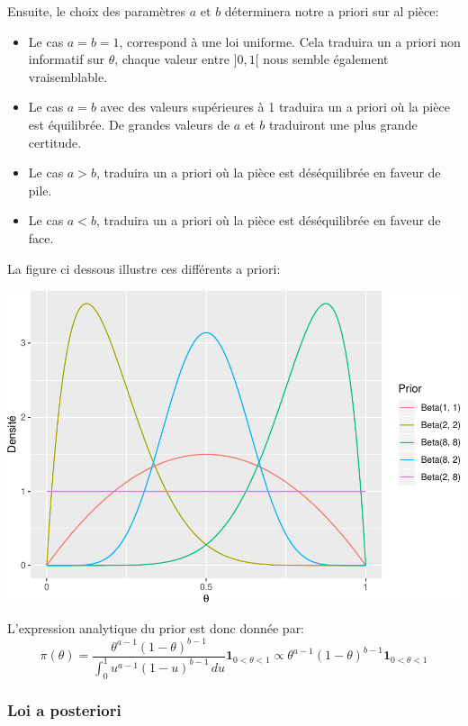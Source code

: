 \documentclass[]{article}
\providecommand{\tightlist}{%
  \setlength{\itemsep}{0pt}\setlength{\parskip}{0pt}}
\begin{document}
Ensuite, le choix des paramètres \(a\) et \(b\) déterminera notre a
priori sur al pièce:

\begin{itemize}
\tightlist
\item
  Le cas \(a = b = 1\), correspond à une loi uniforme. Cela traduira un
  a priori non informatif sur \(\theta\), chaque valeur entre \(]0,1[\)
  nous semble également vraisemblable.
\item
  Le cas \(a = b\) avec des valeurs supérieures à 1 traduira un a priori
  où la pièce est équilibrée. De grandes valeurs de \(a\) et \(b\)
  traduiront une plus grande certitude.
\item
  Le cas \(a > b\), traduira un a priori où la pièce est déséquilibrée
  en faveur de pile.
\item
  Le cas \(a < b\), traduira un a priori où la pièce est déséquilibrée
  en faveur de face.
\end{itemize}

La figure ci dessous illustre ces différents a priori:

\includegraphics{poly_cours_files/figure-latex/df_prior-1.pdf}

L'expression analytique du prior est donc donnée par:
\[\pi(\theta) = \frac {\theta^{a -1}(1-\theta)^{b -1}}{\int _{0}^{1}u^{a -1}(1-u)^{b -1}\,du}\mathbf{1}_{0 < \theta < 1} \propto \theta^{a -1}(1-\theta)^{b -1}\mathbf{1}_{0 < \theta < 1}\]

\hypertarget{loi-a-posteriori}{%
\subsubsection{Loi a posteriori}\label{loi-a-posteriori}}
\end{document}
